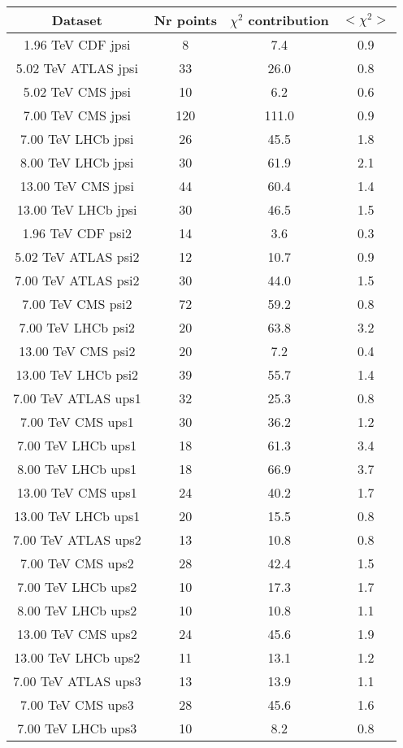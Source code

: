 \begin{table}[h!]
\centering
\begin{tabular}{c|c|c|c}
Dataset & Nr points & $\chi^2$ contribution & $<\chi^2>$ \\
\hline
1.96 TeV CDF jpsi & 8 & 7.4 & 0.9 \\
5.02 TeV ATLAS jpsi & 33 & 26.0 & 0.8 \\
5.02 TeV CMS jpsi & 10 & 6.2 & 0.6 \\
7.00 TeV CMS jpsi & 120 & 111.0 & 0.9 \\
7.00 TeV LHCb jpsi & 26 & 45.5 & 1.8 \\
8.00 TeV LHCb jpsi & 30 & 61.9 & 2.1 \\
13.00 TeV CMS jpsi & 44 & 60.4 & 1.4 \\
13.00 TeV LHCb jpsi & 30 & 46.5 & 1.5 \\
1.96 TeV CDF psi2 & 14 & 3.6 & 0.3 \\
5.02 TeV ATLAS psi2 & 12 & 10.7 & 0.9 \\
7.00 TeV ATLAS psi2 & 30 & 44.0 & 1.5 \\
7.00 TeV CMS psi2 & 72 & 59.2 & 0.8 \\
7.00 TeV LHCb psi2 & 20 & 63.8 & 3.2 \\
13.00 TeV CMS psi2 & 20 & 7.2 & 0.4 \\
13.00 TeV LHCb psi2 & 39 & 55.7 & 1.4 \\
7.00 TeV ATLAS ups1 & 32 & 25.3 & 0.8 \\
7.00 TeV CMS ups1 & 30 & 36.2 & 1.2 \\
7.00 TeV LHCb ups1 & 18 & 61.3 & 3.4 \\
8.00 TeV LHCb ups1 & 18 & 66.9 & 3.7 \\
13.00 TeV CMS ups1 & 24 & 40.2 & 1.7 \\
13.00 TeV LHCb ups1 & 20 & 15.5 & 0.8 \\
7.00 TeV ATLAS ups2 & 13 & 10.8 & 0.8 \\
7.00 TeV CMS ups2 & 28 & 42.4 & 1.5 \\
7.00 TeV LHCb ups2 & 10 & 17.3 & 1.7 \\
8.00 TeV LHCb ups2 & 10 & 10.8 & 1.1 \\
13.00 TeV CMS ups2 & 24 & 45.6 & 1.9 \\
13.00 TeV LHCb ups2 & 11 & 13.1 & 1.2 \\
7.00 TeV ATLAS ups3 & 13 & 13.9 & 1.1 \\
7.00 TeV CMS ups3 & 28 & 45.6 & 1.6 \\
7.00 TeV LHCb ups3 & 10 & 8.2 & 0.8 \\

\end{tabular}
\end{table}
